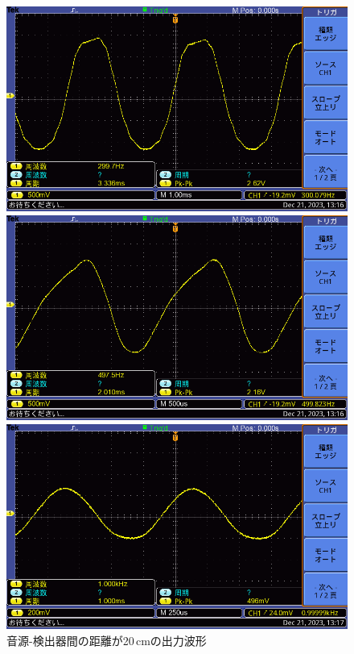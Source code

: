 \documentclass{ltjsarticle}
\begin{document}
\begin{figure}[H]
\begin{minipage}{0.4\columnwidth}
			\centering
			\includegraphics[width = \columnwidth]{figs/F0028TEK.PNG}
			\end{minipage}
			\hspace{0.04\columnwidth}
			\begin{minipage}{0.4\columnwidth}
			\centering
			\includegraphics[width = \columnwidth]{figs/F0029TEK.PNG}
			\end{minipage}
			\hspace{0.04\columnwidth}
			\begin{minipage}{0.4\columnwidth}
			\centering
			\includegraphics[width = \columnwidth]{figs/F0030TEK.PNG}
			\end{minipage}
			\caption{音源-検出器間の距離が20\,cmの出力波形}
			\label{fig:week5-3-20}
			\end{figure}
\end{document}
